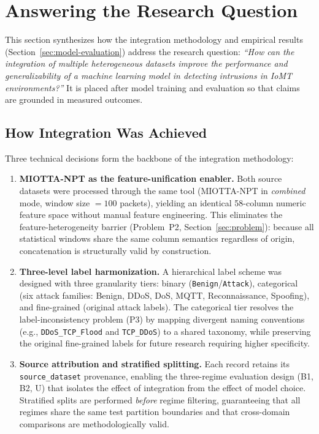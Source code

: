 \section{Answering the Research Question}
\label{sec:answering-rq}

This section synthesizes how the integration methodology and empirical results (Section~\ref{sec:model-evaluation}) address the research question: \textit{``How can the integration of multiple heterogeneous datasets improve the performance and generalizability of a machine learning model in detecting intrusions in IoMT environments?''} It is placed after model training and evaluation so that claims are grounded in measured outcomes.

\subsection{How Integration Was Achieved}
\label{subsec:how-integration}

Three technical decisions form the backbone of the integration methodology:

\begin{enumerate}[nosep]
  \item \textbf{MIOTTA-NPT as the feature-unification enabler.}
  Both source datasets were processed through the same tool (MIOTTA-NPT in \emph{combined} mode, window size $=100$ packets), yielding an identical 58-column numeric feature space without manual feature engineering. This eliminates the feature-heterogeneity barrier (Problem~P2, Section~\ref{sec:problem}): because all statistical windows share the same column semantics regardless of origin, concatenation is structurally valid by construction.

  \item \textbf{Three-level label harmonization.}
  A hierarchical label scheme was designed with three granularity tiers: binary (\texttt{Benign}/\texttt{Attack}), categorical (six attack families: Benign, DDoS, DoS, MQTT, Reconnaissance, Spoofing), and fine-grained (original attack labels). The categorical tier resolves the label-inconsistency problem (P3) by mapping divergent naming conventions (e.g., \texttt{DDoS\_TCP\_Flood} and \texttt{TCP\_DDoS}) to a shared taxonomy, while preserving the original fine-grained labels for future research requiring higher specificity.

  \item \textbf{Source attribution and stratified splitting.}
  Each record retains its \texttt{source\_dataset} provenance, enabling the three-regime evaluation design (B1, B2, U) that isolates the effect of integration from the effect of model choice. Stratified splits are performed \emph{before} regime filtering, guaranteeing that all regimes share the same test partition boundaries and that cross-domain comparisons are methodologically valid.
\end{enumerate}

